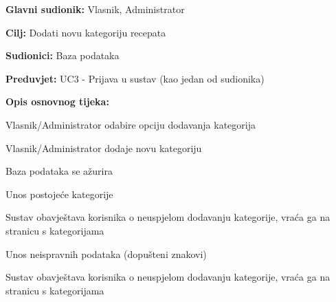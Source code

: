 					\noindent {}
					\begin{packed_item}
	
						\item \textbf{Glavni sudionik: } Vlasnik, Administrator
						\item  \textbf{Cilj:} Dodati novu kategoriju recepata
						\item  \textbf{Sudionici:} Baza podataka
						\item  \textbf{Preduvjet:} UC3 - Prijava u sustav (kao jedan od sudionika)
						\item  \textbf{Opis osnovnog tijeka:}
						
						\item[] \begin{packed_enum}
							
							\item Vlasnik/Administrator odabire opciju dodavanja kategorija
							\item Vlasnik/Administrator dodaje novu kategoriju
							\item Baza podataka se ažurira
						\end{packed_enum}

						\item[] \begin{packed_item}
	
							\item[3.a] Unos postojeće kategorije
							\item[] \begin{packed_enum}
								
								\item Sustav obavještava korisnika o neuspjelom dodavanju 
								kategorije, vraća ga na stranicu s kategorijama
								
							\end{packed_enum}

							\item[3.b] Unos neispravnih podataka (dopušteni znakovi)
							\item[] \begin{packed_enum}
								
								\item Sustav obavještava korisnika o neuspjelom dodavanju 
								kategorije, vraća ga na stranicu s kategorijama							\end{packed_enum}
						\end{packed_item}
					\end{packed_item}

